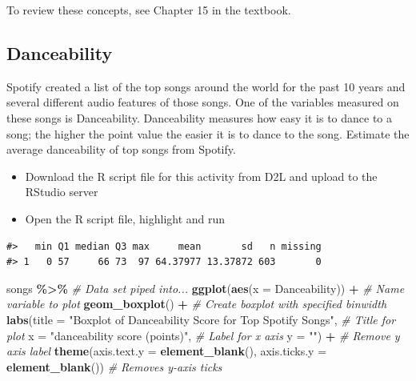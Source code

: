 \documentclass[
]{report}
\newenvironment{Shaded}{\begin{snugshade}}{\end{snugshade}}
\newcommand{\AttributeTok}[1]{\textcolor[rgb]{0.13,0.29,0.53}{#1}}
\newcommand{\CommentTok}[1]{\textcolor[rgb]{0.56,0.35,0.01}{\textit{#1}}}
\newcommand{\FunctionTok}[1]{\textcolor[rgb]{0.13,0.29,0.53}{\textbf{#1}}}
\newcommand{\NormalTok}[1]{#1}
\newcommand{\SpecialCharTok}[1]{\textcolor[rgb]{0.81,0.36,0.00}{\textbf{#1}}}
\newcommand{\StringTok}[1]{\textcolor[rgb]{0.31,0.60,0.02}{#1}}
\begin{document}
To review these concepts, see Chapter 15 in the textbook.

\subsection{Danceability}\label{danceability}

Spotify created a list of the top songs around the world for the past 10 years and several different audio features of those songs. One of the variables measured on these songs is Danceability. Danceability measures how easy it is to dance to a song; the higher the point value the easier it is to dance to the song. Estimate the average danceability of top songs from Spotify.

\begin{itemize}
\item
  Download the R script file for this activity from D2L and upload to the RStudio server
\item
  Open the R script file, highlight and run
\end{itemize}

\begin{verbatim}
#>   min Q1 median Q3 max     mean       sd   n missing
#> 1   0 57     66 73  97 64.37977 13.37872 603       0
\end{verbatim}

\begin{Shaded}
\begin{Highlighting}[]
\NormalTok{songs }\SpecialCharTok{\%\textgreater{}\%} \CommentTok{\# Data set piped into...}
    \FunctionTok{ggplot}\NormalTok{(}\FunctionTok{aes}\NormalTok{(}\AttributeTok{x =}\NormalTok{ Danceability)) }\SpecialCharTok{+}   \CommentTok{\# Name variable to plot}
    \FunctionTok{geom\_boxplot}\NormalTok{() }\SpecialCharTok{+}  \CommentTok{\# Create boxplot with specified binwidth}
    \FunctionTok{labs}\NormalTok{(}\AttributeTok{title =} \StringTok{"Boxplot of Danceability Score for Top Spotify Songs"}\NormalTok{, }\CommentTok{\# Title for plot}
         \AttributeTok{x =} \StringTok{"danceability score (points)"}\NormalTok{, }\CommentTok{\# Label for x axis}
         \AttributeTok{y =} \StringTok{""}\NormalTok{) }\SpecialCharTok{+} \CommentTok{\# Remove y axis label}
    \FunctionTok{theme}\NormalTok{(}\AttributeTok{axis.text.y =} \FunctionTok{element\_blank}\NormalTok{(), }
          \AttributeTok{axis.ticks.y =} \FunctionTok{element\_blank}\NormalTok{()) }\CommentTok{\# Removes y{-}axis ticks}
\end{Highlighting}
\end{Shaded}
\end{document}
